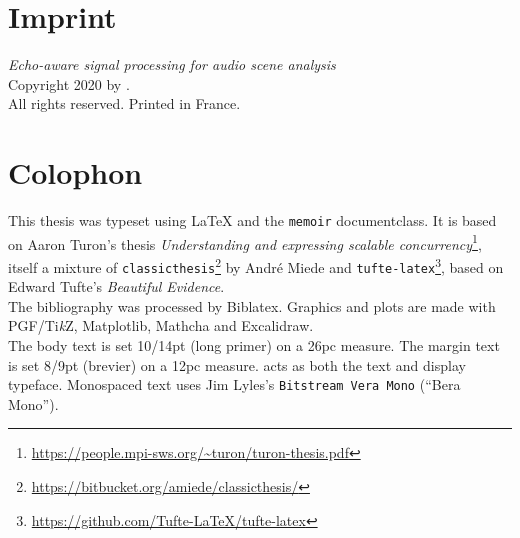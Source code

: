 \thispagestyle{empty}
\hphantom{.}
\vfill

\section*{Imprint}

\textit{Echo-aware signal processing for audio scene analysis}\\
Copyright \textcopyright{} 2020 by \theauthor{}.\\
All rights reserved. Printed in France.\\

\section*{Colophon}

This thesis was typeset using \LaTeX{} and the \texttt{memoir} documentclass.
It is based on Aaron Turon's thesis \emph{Understanding and expressing scalable concurrency}\footnote{\url{https://people.mpi-sws.org/~turon/turon-thesis.pdf}}, itself a mixture of \texttt{classicthesis}\footnote{\url{https://bitbucket.org/amiede/classicthesis/}} by Andr\'e Miede and \texttt{tufte-latex}\footnote{\url{https://github.com/Tufte-LaTeX/tufte-latex}},
 based on Edward Tufte's \emph{Beautiful Evidence}.\\[0.5\baselineskip]
%
The bibliography was processed by Biblatex.
Graphics and plots are made with PGF/Ti\emph{k}Z, Matplotlib, Mathcha and Excalidraw.\\[0.5\baselineskip]
%
The body text is set 10/14pt (long primer) on a 26pc measure.
The margin text is set 8/9pt (brevier) on a 12pc measure.
 acts as both the text and display typeface.
Monospaced text uses Jim Lyles's \texttt{Bitstream Vera Mono} (\enquote{Bera Mono}).

\clearpage{}


